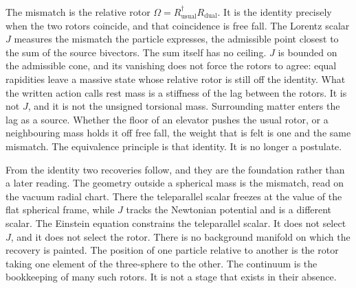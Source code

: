 \documentclass[a4paper]{article}
\begin{document}
The mismatch is the relative rotor $\Omega=R_{\text{usual}}^\dagger R_{\text{dual}}$. It is the identity precisely when the two rotors coincide, and that coincidence is free fall. The Lorentz scalar $J$ measures the mismatch the particle expresses, the admissible point closest to the sum of the source bivectors. The sum itself has no ceiling. $J$ is bounded on the admissible cone, and its vanishing does not force the rotors to agree: equal rapidities leave a massive state whose relative rotor is still off the identity. What the written action calls rest mass is a stiffness of the lag between the rotors. It is not $J$, and it is not the unsigned torsional mass. Surrounding matter enters the lag as a source. Whether the floor of an elevator pushes the usual rotor, or a neighbouring mass holds it off free fall, the weight that is felt is one and the same mismatch. The equivalence principle is that identity. It is no longer a postulate.

From the identity two recoveries follow, and they are the foundation rather than a later reading. The geometry outside a spherical mass is the mismatch, read on the vacuum radial chart. There the teleparallel scalar freezes at the value of the flat spherical frame, while $J$ tracks the Newtonian potential and is a different scalar. The Einstein equation constrains the teleparallel scalar. It does not select $J$, and it does not select the rotor. There is no background manifold on which the recovery is painted. The position of one particle relative to another is the rotor taking one element of the three-sphere to the other. The continuum is the bookkeeping of many such rotors. It is not a stage that exists in their absence.
\end{document}
